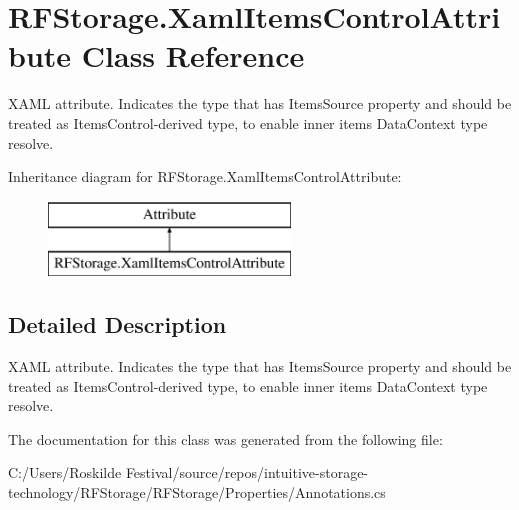 \hypertarget{class_r_f_storage_1_1_xaml_items_control_attribute}{}\section{R\+F\+Storage.\+Xaml\+Items\+Control\+Attribute Class Reference}
\label{class_r_f_storage_1_1_xaml_items_control_attribute}


X\+A\+ML attribute. Indicates the type that has {\ttfamily Items\+Source} property and should be treated as {\ttfamily Items\+Control}-\/derived type, to enable inner items {\ttfamily Data\+Context} type resolve.  


Inheritance diagram for R\+F\+Storage.\+Xaml\+Items\+Control\+Attribute\+:\begin{figure}[H]
\begin{center}
\leavevmode
\includegraphics[height=2.000000cm]{class_r_f_storage_1_1_xaml_items_control_attribute}
\end{center}
\end{figure}


\subsection{Detailed Description}
X\+A\+ML attribute. Indicates the type that has {\ttfamily Items\+Source} property and should be treated as {\ttfamily Items\+Control}-\/derived type, to enable inner items {\ttfamily Data\+Context} type resolve. 



The documentation for this class was generated from the following file\+:\begin{DoxyCompactItemize}
\item 
C\+:/\+Users/\+Roskilde Festival/source/repos/intuitive-\/storage-\/technology/\+R\+F\+Storage/\+R\+F\+Storage/\+Properties/Annotations.\+cs\end{DoxyCompactItemize}
